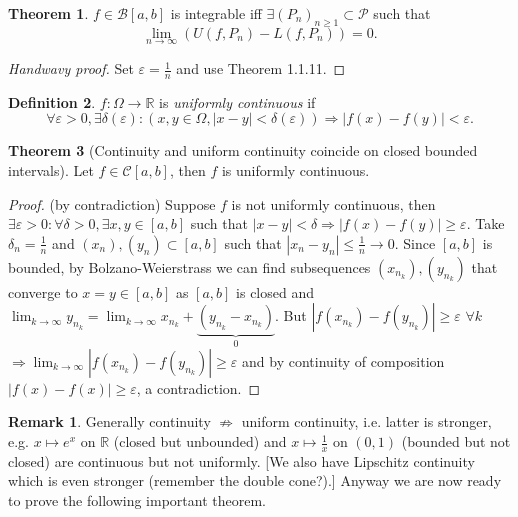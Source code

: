 \documentclass[a4paper]{article}
\theoremstyle{definition}
\newtheorem{defn}{Definition}[subsection]
\newtheorem{thm}[defn]{Theorem}
\newtheorem*{remark}{Remark}
\begin{document}
\begin{thm}
	$f\in \mathcal B [a,b]$ is integrable iff $\exists (P_n)_{n\geq 1} \subset \mathcal P$ such that
\[
\lim_{n\rightarrow \infty} (U(f,P_n)-L(f,P_n))=0 .
\]
\end{thm}

\begin{proof}
	[Handwavy proof] Set $\varepsilon =\frac1n$ and use Theorem 1.1.11.
\end{proof}

\begin{defn}
	$f:\Omega \rightarrow \mathbb R$ is \textit{uniformly continuous} if
\[
\forall \varepsilon >0, \exists \delta (\varepsilon): (x,y\in \Omega, |x-y|<\delta (\varepsilon)) \Rightarrow |f(x)-f(y)|<\varepsilon .
\]
\end{defn}

\begin{thm}[Continuity and uniform continuity coincide on closed bounded intervals]
	Let $f\in \mathcal C [a,b]$, then $f$ is uniformly continuous.
\end{thm}

\begin{proof}
	(by contradiction) Suppose $f$ is not uniformly continuous, then $\exists \varepsilon >0 : \forall \delta >0, \exists x,y \in [a,b]$ such that $|x-y|<\delta \Rightarrow |f(x)-f(y)|\geq \varepsilon .$ Take $\delta _n=\frac1n $ and $(x_n),(y_n) \subset [a,b]$ such that $|x_n-y_n|\leq \frac1n \rightarrow 0 .$ Since $[a,b]$ is bounded, by Bolzano-Weierstrass we can find subsequences $(x_{n_k}),(y_{n_k})$ that converge to $x=y \in [a,b]$ as $[a,b]$ is closed and $\lim_{k\rightarrow \infty} y_{n_k} = \lim_{k\rightarrow \infty} x_{n_k} + \underbrace{(y_{n_k}-x_{n_k})}_{0}$. But $|f(x_{n_k})-f(y_{n_k})|\geq \varepsilon$ $\forall k$ $\Rightarrow \lim_{k\rightarrow \infty} |f(x_{n_k})-f(y_{n_k})| \geq \varepsilon$ and by continuity of composition $|f(x)-f(x)|\geq \varepsilon$, a contradiction.
\end{proof}

\begin{remark}
	Generally continuity $\not\Rightarrow$ uniform continuity, i.e. latter is stronger, e.g. $x\mapsto e^x$ on $\mathbb R$ (closed but unbounded) and $x\mapsto \frac1x$ on $(0,1)$ (bounded but not closed) are continuous but not uniformly. [We also have Lipschitz continuity which is even stronger (remember the double cone?).] Anyway we are now ready to prove the following important theorem.
\end{remark}
\end{document}
